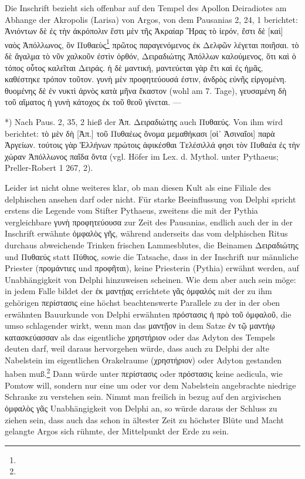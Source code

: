 \documentclass[a4paper, 11pt, oneside]{article}
\begin{document}
Die Inschrift bezieht sich offenbar auf den Tempel des Apollon Deiradiotes am Abhange der Akropolis (Larisa) von Argos, von dem Pausanias 2, 24, 1 berichtet: Ἀνιόντων δὲ ἐς τὴν ἀκρόπολιν ἔστι μὲν τῆς Ἀκραίαρ Ἥρας τὸ ἱερόν, ἔστι δὲ [καὶ] ναὸς Ἀπόλλωνος, ὃν Πυθαεὺς\footnote{} πρῶτος παραγενόμενος ἐκ Δελφῶν λέγεται ποιῆσαι. τὸ δὲ ἄγαλμα τὸ νῦν χαλκοῦν ἐστὶν ὀρθόν, Δειραδιώτης Ἀπόλλων καλούμενος, ὅτι καὶ ὁ τόπος οὗτος καλεῖται Δειράς. ἡ δὲ μαντική, μαντεύεται γὰρ ἔτι καὶ ἐς ἡμᾶς, καθέστηκε τρόπον τοῦτον. γυνὴ μὲν προφητεύουσά ἐστιν, ἀνδρὸς εὐνῆς εἰργομένη. θυομένης δὲ ἐν νυκτὶ ἀρνὸς κατὰ μῆνα ἕκαστον (wohl am 7. Tage), γευσαμένη δὴ τοῦ αἵματος ἡ γυνὴ κάτοχος ἐκ τοῦ θεοῦ γίνεται. ---

*) Nach Paus. 2, 35, 2 hieß der Ἀπ. Δειραδιώτης auch Πυθαεύς. Von ihm wird berichtet: τὸ μὲν δὴ [Ἀπ.] τοῦ Πυθαέως ὄνομα μεμαθήκασι [οἱ᾽ Ἀσιναῖοι] παρὰ Ἀργείων. τούτοις γὰρ Ἑλλήνων πρώτοις ἀφικέσθαι Τελέσιλλά φησι τὸν Πυθαέα ἐς τὴν χώραν Ἀπόλλωνος παῖδα ὄντα (vgl. Höfer im Lex. d. Mythol. unter Pythaeus; Preller-Robert 1 267, 2).

Leider ist nicht ohne weiteres klar, ob man diesen Kult als eine Filiale des delphischen ansehen darf oder nicht. Für starke Beeinflussung von Delphi spricht erstens die Legende vom Stifter Pythaeus, zweitens die mit der Pythia vergleichbare γυνὴ προφητεύουσα zur Zeit des Pausanias, endlich auch der in der Inschrift erwähnte ὀμφαλὸς γῆς, während anderseits das vom delphischen Ritus durchaus abweichende Trinken frischen Lammesblutes, die Beinamen Δειραδιώτης und Πυθαεύς statt Πύθιος, sowie die Tatsache, dass in der Inschrift nur männliche Priester (προμάντιες und προφῆται), keine Priesterin (Pythia) erwähnt werden, auf Unabhängigkeit von Delphi hinzuweisen scheinen. Wie dem aber auch sein möge: in jedem Falle bildet der ἐκ μαντῄας errichtete γᾶς ὀμφαλός mit der zu ihm gehörigen περίστασις eine höchst beachtenswerte Parallele zu der in der oben erwähnten Bauurkunde von Delphi erwähnten πρόστασις ἡ πρὸ τοῦ ὀμφαλοῦ, die umso schlagender wirkt, wenn man das μαντῇον in dem Satze ἐν τῷ μαντήῳ κατασκεύασσαν als das eigentliche χρηστήριον oder das Adyton des Tempels deuten darf, weil daraus hervorgehen würde, dass auch zu Delphi der alte Nabelstein im eigentlichen Orakelraume (χρηστήριον) oder Adyton gestanden haben muß.\footnote{} Dann würde unter περίστασις oder πρόστασις keine aedicula, wie Pomtow will, sondern nur eine um oder vor dem Nabelstein angebrachte niedrige Schranke zu verstehen sein. Nimmt man freilich in bezug auf den argivischen ὀμφαλὸς γᾶς Unabhängigkeit von Delphi an, so würde daraus der Schluss zu ziehen sein, dass auch das schon in ältester Zeit zu höchster Blüte und Macht gelangte Argos sich rühmte, der Mittelpunkt der Erde zu sein.
\end{document}
